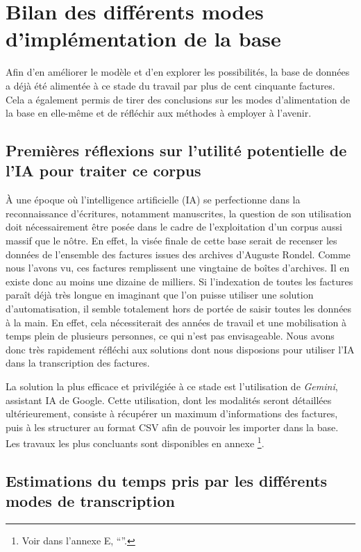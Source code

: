 \chapter{Bilan des différents modes d'implémentation de la base}

Afin d'en améliorer le modèle et d'en explorer les possibilités, la base de données a déjà été alimentée à ce stade du travail par plus de cent cinquante factures. Cela a également permis de tirer des conclusions sur les modes d'alimentation de la base en elle-même et de réfléchir aux méthodes à employer à l'avenir. 

\section{Premières réflexions sur l'utilité potentielle de l'IA pour traiter ce corpus}

À une époque où l'intelligence artificielle (IA) se perfectionne dans la reconnaissance d'écritures, notamment manuscrites, la question de son utilisation doit nécessairement être posée dans le cadre de l'exploitation d'un corpus aussi massif que le nôtre. En effet, la visée finale de cette base serait de recenser les données de l'ensemble des factures issues des archives d'Auguste Rondel. Comme nous l'avons vu, ces factures remplissent une vingtaine de boîtes d'archives. Il en existe donc au moins une dizaine de milliers. Si l'indexation de toutes les factures paraît déjà très longue en imaginant que l'on puisse utiliser une solution d'automatisation, il semble totalement hors de portée de saisir toutes les données à la main. En effet, cela nécessiterait des années de travail et une mobilisation à temps plein de plusieurs personnes, ce qui n'est pas envisageable. Nous avons donc très rapidement réfléchi aux solutions dont nous disposions pour utiliser l'IA dans la transcription des factures. 

La solution la plus efficace et privilégiée à ce stade est l'utilisation de \emph{Gemini}, assistant IA de Google. Cette utilisation, dont les modalités seront détaillées ultérieurement, consiste à récupérer un maximum d'informations des factures, puis à les structurer au format CSV afin de pouvoir les importer dans la base. Les travaux les plus concluants sont disponibles en annexe \footnote{Voir dans l'annexe E, \enquote{}.}.


\section{Estimations du temps pris par les différents modes de transcription}


